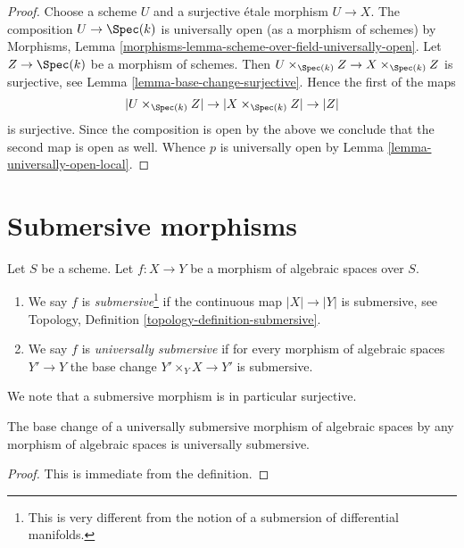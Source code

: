 \begin{proof}
Choose a scheme $U$ and a surjective \'etale morphism $U \to X$.
The composition $U \to \Spec(k)$ is universally open (as a morphism
of schemes) by
Morphisms, Lemma \ref{morphisms-lemma-scheme-over-field-universally-open}.
Let $Z \to \Spec(k)$ be a morphism of schemes. Then
$U \times_{\Spec(k)} Z \to X \times_{\Spec(k)} Z$ is surjective,
see
Lemma \ref{lemma-base-change-surjective}.
Hence the first of the maps
$$
|U \times_{\Spec(k)} Z| \to |X \times_{\Spec(k)} Z| \to |Z|
$$
is surjective. Since the composition is open by the above we conclude that
the second map is open as well. Whence $p$ is universally open by
Lemma \ref{lemma-universally-open-local}.
\end{proof}








\section{Submersive morphisms}
\label{section-submersive}

\begin{definition}
\label{definition-submersive}
Let $S$ be a scheme.
Let $f : X \to Y$ be a morphism of algebraic spaces over $S$.
\begin{enumerate}
\item We say $f$ is {\it submersive}\footnote{This is very different
from the notion of a submersion of differential manifolds.}
if the continuous map $|X| \to |Y|$ is submersive, see
Topology, Definition \ref{topology-definition-submersive}.
\item We say $f$ is {\it universally submersive} if for every
morphism of algebraic spaces $Y' \to Y$ the base change
$Y' \times_Y X \to Y'$ is submersive.
\end{enumerate}
\end{definition}

\noindent
We note that a submersive morphism is in particular surjective.

\begin{lemma}
\label{lemma-base-change-universally-submersive}
The base change of a universally submersive morphism of algebraic spaces
by any morphism of algebraic spaces is universally submersive.
\end{lemma}

\begin{proof}
This is immediate from the definition.
\end{proof}

